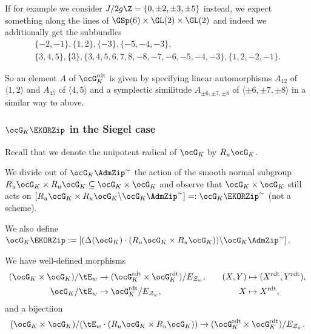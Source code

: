 \documentclass[a4paper]{scrartcl} %
\numberwithin{equation}{section}
\begin{document}
\begin{Example}
\begin{itemize}
    If for example we consider $J/2g\Z=\{0,\pm 2, \pm 3, \pm 5\}$ instead, we expect something along the lines of $\GSp(6)\times \GL(2)\times \GL(2)$ and indeed we additionally get the subbundles
    \begin{align*}
      \{-2, -1\},
      \{1, 2\},
      \{-3\},
      \{-5, -4, -3\}, \\
      \{3, 4, 5\},
      \{3\},
      \{3, 4, 5, 6, 7, 8, -8, -7, -6, -5, -4, -3\},
      \{1, 2, -2, -1\}.
    \end{align*}

    So an element $A$ of $\ocG_K^\mathrm{rdt}$ is given by specifying linear automorphisms $A_{12}$ of  $\langle 1,2\rangle$ and $A_{45}$ of $\langle 4,5\rangle$ and a symplectic similitude $A_{\pm6,\pm7,\pm 8}$ of $\langle\pm 6,\pm 7,\pm 8\rangle$ in a similar way to above.
  \end{itemize}
\end{Example}





\subsubsection{\texorpdfstring{$\ocG_K\EKORZip$}{GK-EKORZip} in the Siegel case}
\label{sec:ekorzip-siegel}


Recall that we denote the unipotent radical of $\ocG_K$ by $R_u\ocG_K$.

We divide out of $\ocG_K\AdmZip^\sim$ the action of the smooth normal subgroup $R_u\ocG_K\times R_u\ocG_K\subseteq\ocG_K\times\ocG_K$ and observe that $\ocG_K\times\ocG_K$ still acts on $[R_u\ocG_K\times R_u\ocG_K \backslash \ocG_K\AdmZip^\sim]=:\ocG_K\EKORZip^\sim$ (not a scheme).

We also define $\ocG_K\EKORZip:=[(\Delta({\ocG_K})\cdot(R_u\ocG_K\times R_u\ocG_K))\backslash \ocG_K\AdmZip^\sim]$.

\begin{Proposition}\label{orbit-rdt}
  We have well-defined morphisms
  \begin{alignat*}{2}
    (\ocG_K\times\ocG_K)/\tE_w &\to (\ocG_K^\mathrm{rdt}\times\ocG_K^\mathrm{rdt})/E_{\mathcal{Z}_w}, &\quad(X,Y)&\mapsto (X^\mathrm{rdt},Y^\mathrm{rdt}), \\
    \ocG_K/\tE_w &\to \ocG_K^\mathrm{rdt}/E_{\mathcal{Z}_w}, &\quad X&\mapsto X^\mathrm{rdt},
  \end{alignat*}
  and a bijectiion
  \begin{equation*}
    (\ocG_K\times\ocG_K)/(\tE_w\cdot(R_u\ocG_K\times R_u\ocG_K)) \to (\ocG_K^\mathrm{rdt}\times\ocG_K^\mathrm{rdt})/E_{\mathcal{Z}_w}.
  \end{equation*}
\end{Proposition}
\end{document}

